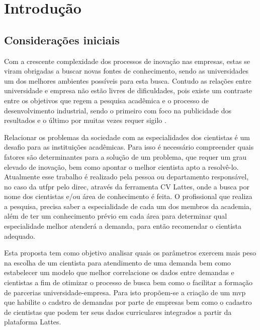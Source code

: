 \chapter{Introdução}\label{cap:introducao}

\section{Considerações iniciais}\label{sec:consideracoesIniciais}

Com a crescente complexidade dos processos de inovação nas empresas, estas se viram obrigadas a buscar novas fontes de conhecimento, sendo as universidades um dos melhores ambientes possíveis para esta busca. Contudo as relações entre universidade e empresa não estão livres de dificuldades, pois existe um contraste entre os objetivos que regem a pesquisa acadêmica e o processo de desenvolvimento industrial, sendo o primeiro com foco na publicidade dos resultados e o último por muitas vezes requer sigilo \cite{UnicampIE}. 

Relacionar os problemas da sociedade com as especialidades dos cientistas é um desafio para as instituições acadêmicas. Para isso é necessário compreender quais fatores são determinantes para a solução de um problema, que requer um grau elevado de inovação, bem como apontar o melhor cientista apto a resolvê-lo. Atualmente esse trabalho é realizado pela pessoa ou departamento responsável, no caso da \gls{utfpr} pelo \gls{direc}, através da ferramenta CV Lattes, onde a busca por nome dos cientistas e/ou área de conhecimento é feita. O profissional que realiza a pesquisa, precisa saber a especialidade de cada um dos membros da academia, além de ter um conhecimento prévio em cada área para determinar qual especialidade melhor atenderá a demanda, para então recomendar o cientista adequado.

Esta proposta tem como objetivo analisar quais os parâmetros exercem mais peso na escolha de um cientista para atendimento de uma demanda bem como estabelecer um modelo que melhor correlacione os dados entre demandas e cientistas a fim de otimizar o processo de busca bem como o facilitar a formação de parcerias universidade-empresa. Para isto propõem-se a criação de um \gls{mvp} que habilite o cadstro de demandas por parte de empresas bem como o cadastro de cientistas que podem ter seus dados curriculares integrados a partir da plataforma Lattes.

